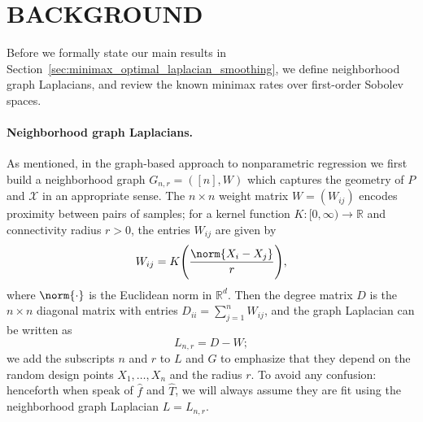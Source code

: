 \documentclass[twoside]{article}
\newcommand{\Reals}{\mathbb{R}}
\newcommand{\1}{\mathbf{1}}
\newcommand{\Rd}{\Reals^d}
\newcommand{\Lap}{L}
\newcommand{\Xset}{\mathcal{X}}
\newcommand{\Leb}{L}
\newcommand{\mc}[1]{\mathcal{#1}}
\newcommand{\wh}[1]{\widehat{#1}}
\theoremstyle{definition}
\theoremstyle{remark}
\begin{document}

\section{BACKGROUND}
\label{sec:problem_setup_and_background}
Before we formally state our main results in Section~\ref{sec:minimax_optimal_laplacian_smoothing}, we define neighborhood graph Laplacians, and review the known minimax rates over first-order Sobolev spaces.

\paragraph{Neighborhood graph Laplacians.}
As mentioned, in the graph-based approach to nonparametric regression we first build a neighborhood graph $G_{n,r} = ([n],W)$ which captures the geometry of $P$ and $\mc{X}$ in an appropriate sense. The $n \times n$ weight matrix $W = (W_{ij})$ encodes proximity between pairs of samples; for a kernel function $K: [0,\infty) \to \Reals$ and connectivity radius $r > 0$, the entries $W_{ij}$ are given by
\begin{equation*}
\label{eqn:neighborhood_graph}
W_{ij} = K\Biggl(\frac{\norm{X_i - X_j}}{r}\Biggr),
\end{equation*}
where $\norm{\cdot}$ is the Euclidean norm in $\Rd$. Then the degree matrix $D$ is the $n \times n$ diagonal matrix with entries $D_{ii} = \sum_{j = 1}^{n}W_{ij}$, and the graph Laplacian can be written as
\begin{equation}
\label{eqn:graph_Laplacian}
\Lap_{n,r} = D - W;
\end{equation}
we add the subscripts $n$ and $r$ to $\Lap$ and $G$ to emphasize that they depend on the random design points $X_1,\ldots,X_n$ and the radius $r$. To avoid any confusion: henceforth when speak of $\wh{f}$ and $\wh{T}$, we will always assume they are fit using the neighborhood graph Laplacian $L = L_{n,r}$. 
\end{document}
